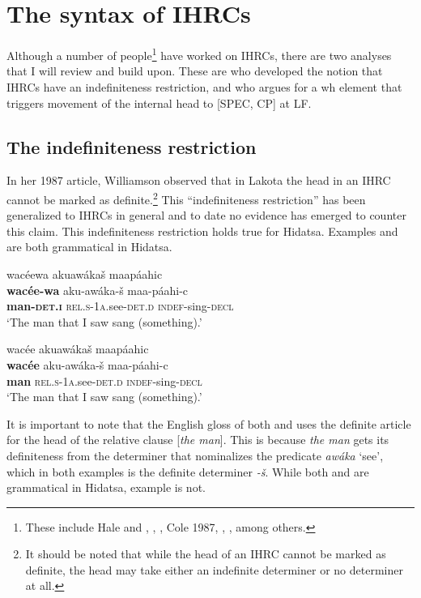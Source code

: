 \documentclass[output=paper]{LSP/langsci}
\begin{document}
\section{The syntax of IHRCs} 

Although a number of people\footnote{These include Hale and \citet{Platero1974}, \citet{Gorbet1976}, \citet{Faconnier1979}, Cole 1987, \citet{Culy1990}, \citet{Kayne1994} \citet{Bianchi1999}, \citet{Citko2001} among others.} have worked on IHRCs, there are two analyses that I will review and build upon. These are \citet{Williamson1987} who developed the notion that IHRCs have an indefiniteness restriction, and \citet{Culy1990} who argues for a wh element that triggers movement of the internal head to [SPEC, CP] at LF.

\subsection{The indefiniteness restriction} 

In her 1987 article, Williamson observed that in Lakota the head in an IHRC cannot be marked as definite.\footnote{It should be noted that while the head of an IHRC cannot be marked as definite, the head may take either an indefinite determiner or no determiner at all.} This ``indefiniteness restriction'' has been generalized to IHRCs in general and to date no evidence has emerged to counter this claim. This indefiniteness restriction holds true for Hidatsa.  Examples  and  are both grammatical in Hidatsa.

\ea  \label{boyle13}
\glll wac\'eewa akuaw\'aka\v{s} maap\'aahic\\
\textbf{wac\'ee-wa}     aku-aw\'aka-\v{s}       maa-p\'aahi-c\\
\textbf{man-\textsc{det.i}} \textsc{rel.s-1a}.see-\textsc{det.d} \textsc{indef}-sing-\textsc{decl}\\ 
\trans `The man that I saw sang (something).' 
\z

\ea \label{boyle14}
\glll wac\'ee akuaw\'aka\v{s} maap\'aahic\\
\textbf{wac\'ee}  aku-aw\'aka-\v{s} maa-p\'aahi-c\\
\textbf{man} \textsc{rel.s-1a}.see-\textsc{det.d} \textsc{indef}-sing-\textsc{decl}\\
\trans `The man that I saw sang (something).' 
\z

It is important to note that the English gloss of both  and  uses the definite article for the head of the relative clause [\textit{the man}]. This is because \textit{the man} gets its definiteness from the determiner that nominalizes the predicate \textit{aw\'aka} `see', which in both examples is the definite determiner \textit{-\v{s}}. While both  and  are grammatical in Hidatsa, example  is not.
\end{document}
